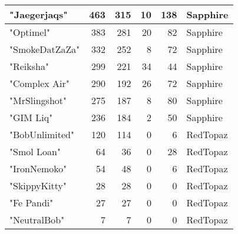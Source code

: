 \documentclass{article}
\begin{document}
\begin{table}[htbp]
\begin{tabular}{|l|r|r|r|r|l|}
"Jaegerjaqs" & 463 & 315 & 10 & 138 & Sapphire \\ \hline
"Optimel" & 383 & 281 & 20 & 82 & Sapphire \\ \hline
"SmokeDatZaZa" & 332 & 252 & 8 & 72 & Sapphire \\ \hline
"Reiksha" & 299 & 221 & 34 & 44 & Sapphire \\ \hline
"Complex Air" & 290 & 192 & 26 & 72 & Sapphire \\ \hline
"MrSlingshot" & 275 & 187 & 8 & 80 & Sapphire \\ \hline
"GIM Liq" & 236 & 184 & 2 & 50 & Sapphire \\ \hline
"BobUnlimited" & 120 & 114 & 0 & 6 & RedTopaz \\ \hline
"Smol Loan" & 64 & 36 & 0 & 28 & RedTopaz \\ \hline
"IronNemoko" & 54 & 48 & 0 & 6 & RedTopaz \\ \hline
"SkippyKitty" & 28 & 28 & 0 & 0 & RedTopaz \\ \hline
"Fe Pandi" & 27 & 27 & 0 & 0 & RedTopaz \\ \hline
"NeutralBob" & 7 & 7 & 0 & 0 & RedTopaz \\ \hline
\end{tabular}
\end{table}
\end{document}
